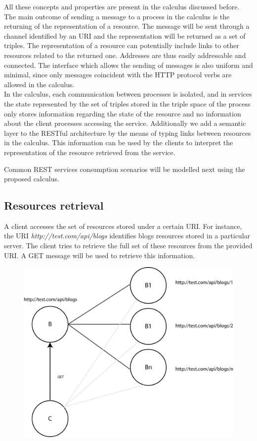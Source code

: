 All these concepts and properties are present in the calculus discussed before. The main outcome of sending a message to a process in the calculus is the returning of the representation of a resource. The message will be sent through a channel identified by an URI and the representation will be returned as a set of triples. The representation of a resource can potentially include links to other resources related to the returned one. Addresses are thus easily addressable and connected. The interface which allows the sending of messages is also uniform and minimal, since only messages coincident with the HTTP protocol verbs are allowed in the calculus.\\
In the calculus, each communication between processes is isolated, and in services the state represented by the set of triples stored in the triple space of the process only stores information regarding the state of the resource and no information about the client processes accessing the service.
Additionally we add a semantic layer to the RESTful architecture by the means of typing links between resources in the calculus. This information can be used by the clients to interpret the representation of the resource retrieved from the service.

Common REST services consumption scenarios will be modelled next using the proposed calculus.

\subsection{Resources retrieval}

A client accesses the set of resources stored under a certain URI. For instance, the URI \emph{http://test.com/api/blogs} identifies blogs resources stored in a particular server. The client tries to retrieve the full set of these resources from the provided URI. A GET message will be used to retrieve this information.

\begin{figure}[htb!]
\centering%
\includegraphics{get_ex.png}
\end{figure}

